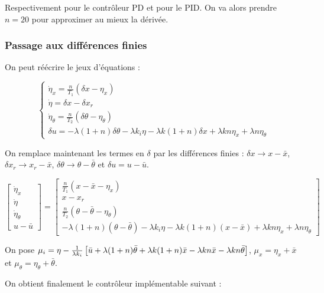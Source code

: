 \documentclass[10pt]{article}
\begin{document}
\vspace{10px}

\noindent Respectivement pour le contrôleur PD et pour le PID. On va alors prendre $n = 20$ pour approximer au mieux
la dérivée. 

\subsubsection*{Passage aux différences finies}

\noindent On peut réécrire le jeux d'équations :

\[
	\begin{cases}
		\dot \eta_x = \frac{n}{T_1} ( \delta x - \eta_x ) \\
		\dot \eta = \delta x - \delta x_r \\
		\dot \eta_\theta = \frac{n}{T_2} ( \delta \theta - \eta_\theta ) \\
		\delta u = - \lambda ( 1 + n ) \delta \theta - \lambda k_i \eta -  \lambda k (1 + n) \delta x +
		\lambda k n \eta_x + \lambda n \eta_\theta
	\end{cases}
\]

\noindent On remplace maintenant les termes en $\delta$ par les différences finies : $\delta x \to x - \bar x$,
$\delta x_r \to x_r - \bar x$, $\delta \theta \to \theta - \bar \theta$ et $\delta u = u - \bar u$.

\[
	\begin{bmatrix}
		\dot \eta_x \\
		\dot \eta \\
		\dot \eta_\theta \\
		u - \bar u
	\end{bmatrix}
	= \begin{bmatrix}
		\frac{n}{T_1} ( x - \bar x - \eta_x ) \\
		x - x_r \\
		\frac{n}{T_2} ( \theta - \bar \theta - \eta_\theta ) \\
		- \lambda ( 1 + n ) ( \theta - \bar \theta ) - \lambda k_i \eta - \lambda k (1 + n) ( x - \bar x ) +
		\lambda k n \eta_x + \lambda n \eta_\theta
	\end{bmatrix}
\]

\noindent On pose  $\mu_i = \eta - \frac{1}{\lambda k_i} \left[ \bar u +
\lambda (1 + n) \bar \theta + \lambda k (1 + n) \bar x - \lambda k n \bar x -
\lambda k n \bar \theta \right]$, $\mu_x = \eta_x + \bar x$ et $\mu_\theta = \eta_\theta + \bar \theta$.

\noindent On obtient finalement le contrôleur implémentable suivant :
\end{document}
